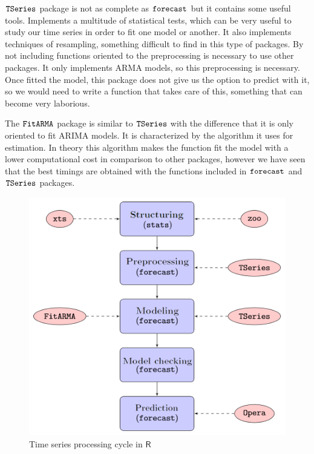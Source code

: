 \documentclass[12pt,a4paper,oneside]{article}
\begin{document}
$\verb!TSeries!$ package is not as complete as $\verb!forecast!$ but it contains some useful tools. Implements a multitude of statistical tests, which can be very useful to study our time series in order to fit one model or another. It also implements techniques of resampling, something difficult to find in this type of packages. By not including functions oriented to the preprocessing is necessary to use other packages. It only implements ARMA models, so this preprocessing is necessary. Once fitted the model, this package does not give us the option to predict with it, so we would need to write a function that takes care of this, something that can become very laborious.

The $\verb!FitARMA!$ package is similar to $\verb!TSeries!$ with the difference that it is only oriented to fit ARIMA models. It is characterized by the algorithm it uses for estimation. In theory this algorithm makes the function fit the model with a lower computational cost in comparison to other packages, however we have seen that the best timings are obtained with the functions included in $\verb!forecast!$ and $\verb!TSeries!$ packages.

\begin{figure}
    \centering
    \centerline{\includegraphics[scale = 0.4]{scheme.png}}
    \caption{Time series processing cycle in $\textsf{R}$}
    \label{esquema}
\end{figure}
\end{document}
